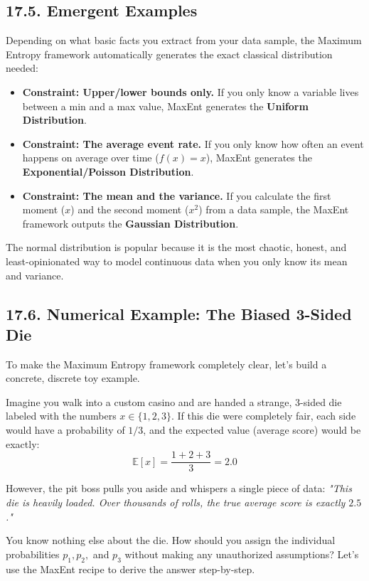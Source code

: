 \documentclass{article}
\begin{document}
\subsection*{17.5. Emergent Examples}
Depending on what basic facts you extract from your data sample, the Maximum Entropy framework automatically generates the exact classical distribution needed:
\begin{itemize}
    \item \textbf{Constraint: Upper/lower bounds only.} If you only know a variable lives between a min and a max value, MaxEnt generates the \textbf{Uniform Distribution}.
    \item \textbf{Constraint: The average event rate.} If you only know how often an event happens on average over time ($f(x) = x$), MaxEnt generates the \textbf{Exponential/Poisson Distribution}.
    \item \textbf{Constraint: The mean and the variance.} If you calculate the first moment ($x$) and the second moment ($x^2$) from a data sample, the MaxEnt framework outputs the \textbf{Gaussian Distribution}. 
\end{itemize}
The normal distribution is popular because it is the most chaotic, honest, and least-opinionated way to model continuous data when you only know its mean and variance.

\subsection*{17.6. Numerical Example: The Biased 3-Sided Die}

To make the Maximum Entropy framework completely clear, let's build a concrete, discrete toy example. 

Imagine you walk into a custom casino and are handed a strange, 3-sided die labeled with the numbers $x \in \{1, 2, 3\}$. If this die were completely fair, each side would have a probability of $1/3$, and the expected value (average score) would be exactly:
\begin{equation*}
\mathbb{E}[x] = \frac{1 + 2 + 3}{3} = 2.0
\end{equation*}

However, the pit boss pulls you aside and whispers a single piece of data: \textit{"This die is heavily loaded. Over thousands of rolls, the true average score is exactly $2.5$."} 

You know nothing else about the die. How should you assign the individual probabilities $p_1, p_2,$ and $p_3$ without making any unauthorized assumptions? Let's use the MaxEnt recipe to derive the answer step-by-step.
\end{document}
